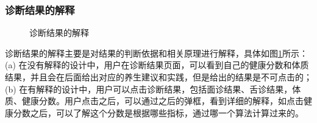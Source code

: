 \subsubsection{诊断结果的解释}
\begin{figure}[htbp]
    \centering
    \caption{诊断结果的解释}
    \label{fig:exp_result}
\end{figure}

诊断结果的解释主要是对结果的判断依据和相关原理进行解释，具体如图\ref{fig:exp_result}所示：
(a) 在没有解释的设计中，用户在诊断结果页面，可以看到自己的健康分数和体质结果，并且会在后面给出对应的养生建议和实践，但是给出的结果是不可点击的；
(b) 在有解释的设计中，用户可以点击诊断结果，包括面诊结果、舌诊结果，体质、健康分数。用户点击之后，可以通过之后的弹框，看到详细的解释，如点击健康分数之后，可以了解这个分数是根据哪些指标，通过哪一个算法计算过来的。

